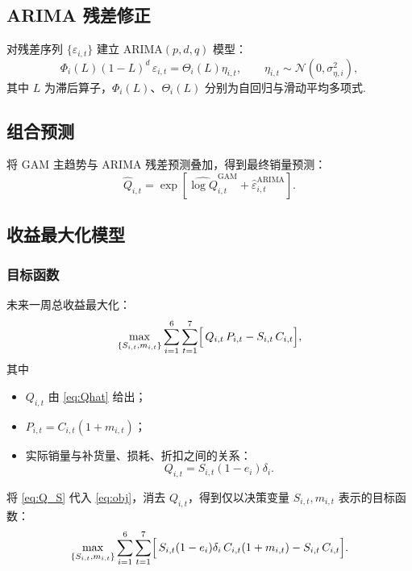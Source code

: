 \documentclass{cumcmthesis}
\begin{document}
\subsection{ARIMA 残差修正}
对残差序列 $\{\varepsilon_{i,t}\}$ 建立 ARIMA$(p,d,q)$ 模型：
\begin{equation}
\Phi_i(L)(1-L)^d\,\varepsilon_{i,t} = \Theta_i(L)\eta_{i,t},
\qquad \eta_{i,t}\sim\mathcal{N}(0,\sigma_{\eta,i}^2),
\label{eq:ARIMA}
\end{equation}
其中 $L$ 为滞后算子，$\Phi_i(L)$、$\Theta_i(L)$ 分别为自回归与滑动平均多项式.

\subsection{组合预测}
将 GAM 主趋势与 ARIMA 残差预测叠加，得到最终销量预测：
\begin{equation}
\widehat{Q}_{i,t} = \exp\!\left[\widehat{\log Q}_{i,t}^{\text{GAM}}
+ \widehat{\varepsilon}_{i,t}^{\text{ARIMA}}\right].
\label{eq:Qhat}
\end{equation}

\subsection{收益最大化模型}
\subsubsection{目标函数}
未来一周总收益最大化：
\begin{equation}
\max_{\{S_{i,t},m_{i,t}\}}
\sum_{i=1}^6\sum_{t=1}^7
\Bigl[\,Q_{i,t}\,P_{i,t}-S_{i,t}\,C_{i,t}\Bigr],
\label{eq:obj}
\end{equation}
其中
\begin{itemize}
\item $Q_{i,t}$ 由 \eqref{eq:Qhat} 给出；
\item $P_{i,t}=C_{i,t}(1+m_{i,t})$；
\item 实际销量与补货量、损耗、折扣之间的关系：
      \begin{equation}
      Q_{i,t} = S_{i,t}(1-e_i)\delta_i.
      \label{eq:Q_S}
      \end{equation}
\end{itemize}

将 \eqref{eq:Q_S} 代入 \eqref{eq:obj}，消去 $Q_{i,t}$，得到仅以决策变量 $S_{i,t},m_{i,t}$ 表示的目标函数：
\begin{equation}
\max_{\{S_{i,t},m_{i,t}\}}
\sum_{i=1}^6\sum_{t=1}^7
\Bigl[\,S_{i,t}(1-e_i)\delta_i\,C_{i,t}(1+m_{i,t})-S_{i,t}\,C_{i,t}\Bigr].
\label{eq:obj_simp}
\end{equation}
\end{document}
